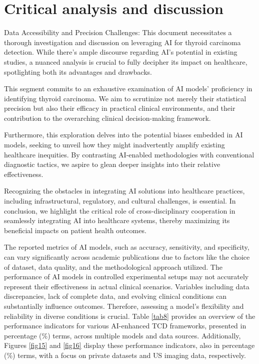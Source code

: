 \documentclass[a4paper,fleqn]{cas-sc}
\begin{document}
\section{Critical analysis and discussion} \label{sec7}
Data Accessibility and Precision Challenges: This document necessitates a thorough investigation and discussion on leveraging \ac{AI} for thyroid carcinoma detection. While there's ample discourse regarding \ac{AI}'s potential in existing studies, a nuanced analysis is crucial to fully decipher its impact on healthcare, spotlighting both its advantages and drawbacks.

This segment commits to an exhaustive examination of \ac{AI} models' proficiency in identifying thyroid carcinoma. We aim to scrutinize not merely their statistical precision but also their efficacy in practical clinical environments, and their contribution to the overarching clinical decision-making framework.

Furthermore, this exploration delves into the potential biases embedded in \ac{AI} models, seeking to unveil how they might inadvertently amplify existing healthcare inequities. By contrasting \ac{AI}-enabled methodologies with conventional diagnostic tactics, we aspire to glean deeper insights into their relative effectiveness.

Recognizing the obstacles in integrating \ac{AI} solutions into healthcare practices, including infrastructural, regulatory, and cultural challenges, is essential. In conclusion, we highlight the critical role of cross-disciplinary cooperation in seamlessly integrating \ac{AI} into healthcare systems, thereby maximizing its beneficial impacts on patient health outcomes.

The reported metrics of \ac{AI} models, such as accuracy, sensitivity, and specificity, can vary significantly across academic publications due to factors like the choice of dataset, data quality, and the methodological approach utilized. The performance of \ac{AI} models in controlled experimental setups may not accurately represent their effectiveness in actual clinical scenarios. Variables including data discrepancies, lack of complete data, and evolving clinical conditions can substantially influence outcomes. Therefore, assessing a model's flexibility and reliability in diverse conditions is crucial. Table \ref{tab8} provides an overview of the performance indicators for various \ac{AI}-enhanced \ac{TCD} frameworks, presented in percentage (\%) terms, across multiple models and data sources. Additionally, Figures \ref{fig15} and \ref{fig16} display these performance indicators, also in percentage (\%) terms, with a focus on private datasets and \ac{US} imaging data, respectively.
\end{document}
